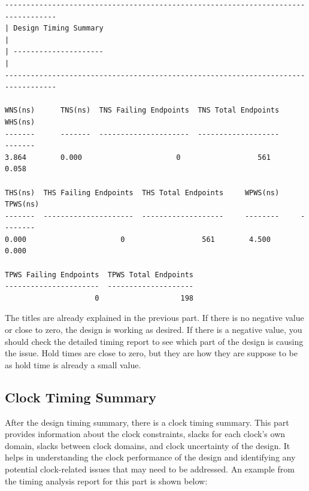 \documentclass{report}
\begin{document}
\begin{verbatim}
----------------------------------------------------------------------------------
| Design Timing Summary                                                          |
| ---------------------                                                          |
----------------------------------------------------------------------------------

WNS(ns)      TNS(ns)  TNS Failing Endpoints  TNS Total Endpoints      WHS(ns)      
-------      -------  ---------------------  -------------------      -------
3.864        0.000                      0                  561        0.058

THS(ns)  THS Failing Endpoints  THS Total Endpoints     WPWS(ns)     TPWS(ns)  
-------  ---------------------  -------------------     --------     -------- 
0.000                      0                  561        4.500        0.000   

TPWS Failing Endpoints  TPWS Total Endpoints  
----------------------  --------------------
                     0                   198    
\end{verbatim}

The titles are already explained in the previous part. If there is no negative value or close to zero, the design is working as desired. If there is a negative value, you should check the detailed timing report to see which part of the design is causing the issue.
Hold times are close to zero, but they are how they are suppose to be as hold time is already a small value.

\subsection{Clock Timing Summary}
After the design timing summary, there is a clock timing summary. This part provides information about the clock constraints, slacks for each clock's own domain, slacks between clock domains, and clock uncertainty of the design. It helps in understanding the clock performance of the design and identifying any potential clock-related issues that may need to be addressed.
An example from the timing analysis report for this part is shown below:
\end{document}
